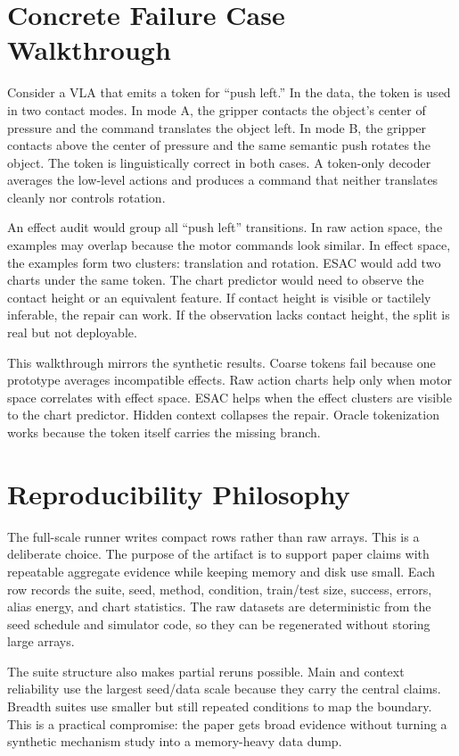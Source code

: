 \documentclass{article}
\begin{document}
\section{Concrete Failure Case Walkthrough}

Consider a VLA that emits a token for ``push left.'' In the data, the token is
used in two contact modes. In mode A, the gripper contacts the object's center
of pressure and the command translates the object left. In mode B, the gripper
contacts above the center of pressure and the same semantic push rotates the
object. The token is linguistically correct in both cases. A token-only decoder
averages the low-level actions and produces a command that neither translates
cleanly nor controls rotation.

An effect audit would group all ``push left'' transitions. In raw action space,
the examples may overlap because the motor commands look similar. In effect
space, the examples form two clusters: translation and rotation. ESAC would add
two charts under the same token. The chart predictor would need to observe the
contact height or an equivalent feature. If contact height is visible or
tactilely inferable, the repair can work. If the observation lacks contact
height, the split is real but not deployable.

This walkthrough mirrors the synthetic results. Coarse tokens fail because one
prototype averages incompatible effects. Raw action charts help only when motor
space correlates with effect space. ESAC helps when the effect clusters are
visible to the chart predictor. Hidden context collapses the repair. Oracle
tokenization works because the token itself carries the missing branch.

\section{Reproducibility Philosophy}

The full-scale runner writes compact rows rather than raw arrays. This is a
deliberate choice. The purpose of the artifact is to support paper claims with
repeatable aggregate evidence while keeping memory and disk use small. Each row
records the suite, seed, method, condition, train/test size, success, errors,
alias energy, and chart statistics. The raw datasets are deterministic from the
seed schedule and simulator code, so they can be regenerated without storing
large arrays.

The suite structure also makes partial reruns possible. Main and context
reliability use the largest seed/data scale because they carry the central
claims. Breadth suites use smaller but still repeated conditions to map the
boundary. This is a practical compromise: the paper gets broad evidence without
turning a synthetic mechanism study into a memory-heavy data dump.
\end{document}
